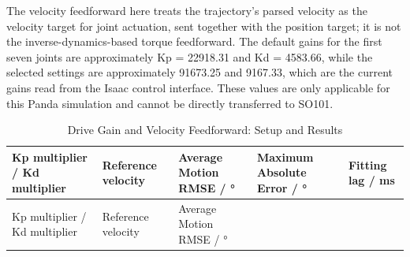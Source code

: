 The velocity feedforward here treats the trajectory's parsed velocity as the velocity target for joint actuation, sent together with the position target; it is not the inverse-dynamics-based torque feedforward. The default gains for the first seven joints are approximately Kp = 22918.31 and Kd = 4583.66, while the selected settings are approximately 91673.25 and 9167.33, which are the current gains read from the Isaac control interface. These values are only applicable for this Panda simulation and cannot be directly transferred to SO101.

\FloatBarrier\begingroup\small\setlength{\tabcolsep}{2.5pt}
\begin{longtable}[]{@{}
  >{\raggedright\arraybackslash}p{}
  >{\raggedright\arraybackslash}p{}
  >{\raggedright\arraybackslash}p{}
  >{\raggedright\arraybackslash}p{}
  >{\raggedright\arraybackslash}p{}@{}}
\caption{Drive Gain and Velocity Feedforward: Setup and Results}\label{tab:s04-1}\tabularnewline
\toprule\noalign{}
\begin{minipage}[b]{\linewidth}\raggedright
Kp multiplier / Kd multiplier
\end{minipage} & \begin{minipage}[b]{\linewidth}\raggedright
Reference velocity
\end{minipage} & \begin{minipage}[b]{\linewidth}\raggedright
Average Motion RMSE / °
\end{minipage} & \begin{minipage}[b]{\linewidth}\raggedright
Maximum Absolute Error / °
\end{minipage} & \begin{minipage}[b]{\linewidth}\raggedright
Fitting lag / ms
\end{minipage} \\
\midrule\noalign{}
\endfirsthead
\toprule\noalign{}
\begin{minipage}[b]{\linewidth}\raggedright
Kp multiplier / Kd multiplier
\end{minipage} & \begin{minipage}[b]{\linewidth}\raggedright
Reference velocity
\end{minipage} & \begin{minipage}[b]{\linewidth}\raggedright
Average Motion RMSE / °
\end{minipage} & \begin{minipage}[b]{\linewidth}\raggedright

\end{minipage}
\end{longtable}
